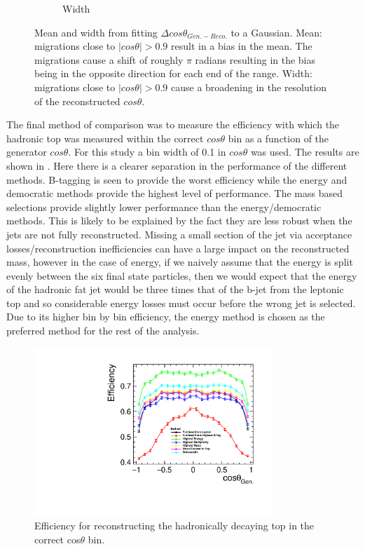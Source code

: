 \begin{figure}
\begin{subfigure}{.8\textwidth}
    \caption[Width]{Width}
  \end{subfigure}
  \caption[Mean and width from fitting $\Delta cos\theta_{Gen.-Reco.}$ to a Gaussian]{Mean and width from fitting $\Delta cos\theta_{Gen.-Reco.}$ to a Gaussian. Mean: migrations close to $\mid cos\theta\mid>0.9$ result in a bias in the mean. The migrations cause a shift of roughly $\pi$ radians resulting in the bias being in the opposite direction for each end of the range. Width: migrations close to $\mid cos\theta\mid>0.9$ cause a broadening in the resolution of the reconstructed $cos\theta$.}
  \label{fig:angleFitDiff}
\end{figure}

The final method of comparison was to measure the efficiency with which the hadronic top was measured within the correct $cos\theta$ bin as a function of the generator $cos\theta$. For this study a bin width of 0.1 in $cos\theta$ was used. The results are shown in . Here there is a clearer separation in the performance of the different methods. B-tagging is seen to provide the worst efficiency while the energy and democratic methods provide the highest level of performance. The mass based selections provide slightly lower performance than the energy/democratic methods. This is likely to be explained by the fact they are less robust when the jets are not fully reconstructed. Missing a small section of the jet via acceptance losses/reconstruction inefficiencies can have a large impact on the reconstructed mass, however in the case of energy, if we naively assume that the energy is split evenly between the six final state particles, then we would expect that the energy of the hadronic fat jet would be three times that of the b-jet from the leptonic top and so considerable energy losses must occur before the wrong jet is selected. Due to its higher bin by bin efficiency, the energy method is chosen as the preferred method for the rest of the analysis. 

\begin{figure}
  \centering
  \includegraphics[width=0.8\textwidth]{TopAnalysis/figures/EfficiencyvsMCTheta.pdf}
  \caption[Efficiency for reconstructing the hadronically decaying top in the correct cos$\theta$ bin]{Efficiency for reconstructing the hadronically decaying top in the correct cos$\theta$ bin.}
  \label{fig:angularEfficiency}
\end{figure}

